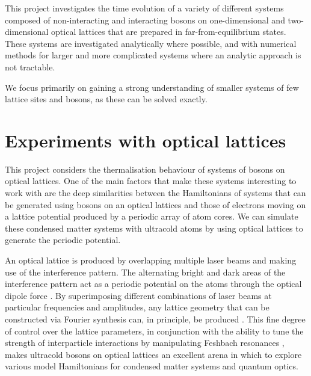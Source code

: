 \documentclass[prb, twocolumn, final]{revtex4-1}
\theoremstyle{plain}
\begin{document}
This project investigates the time evolution of a variety of different systems
composed of non-interacting and interacting bosons on one-dimensional and
two-dimensional optical lattices that are prepared in far-from-equilibrium
states. These systems are investigated analytically where possible, and with
numerical methods for larger and more complicated systems where an analytic
approach is not tractable.

We focus primarily on gaining a strong
understanding of smaller systems of few lattice sites and bosons, as these
can be solved exactly.
\newpage


\section{Experiments with optical lattices}

This project considers the thermalisation behaviour of systems of bosons on
optical lattices. One of the main factors that make these systems interesting
to work with are the deep similarities between the Hamiltonians of systems that
can be generated using bosons on an optical lattices and those of electrons
moving on a lattice potential produced by a periodic array of atom cores. We can
simulate these condensed matter systems with ultracold atoms by using optical
lattices to generate the periodic potential.

An optical lattice is produced by
overlapping multiple laser beams and making use of the interference pattern.
The alternating bright and dark areas of the interference pattern act as a
periodic potential on the atoms through the optical dipole force
\cite{Bloch2012}. By superimposing different combinations of laser beams at
particular frequencies and amplitudes, any lattice geometry that can be
constructed via Fourier synthesis can, in principle, be produced
\cite{Bloch2012}. This fine degree of control over the lattice parameters, in
conjunction with the ability to tune the strength of interparticle interactions
by manipulating Feshbach resonances \cite{Chin2010}, makes ultracold bosons on
optical lattices an excellent arena in which to explore various model
Hamiltonians for condensed matter systems and quantum optics.
\end{document}
